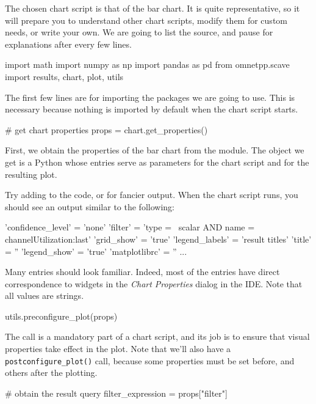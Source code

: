 The chosen chart script is that of the bar chart. It is quite representative, so
it will prepare you to understand other chart scripts, modify them for custom
needs, or write your own. We are going to list the source, and pause for
explanations after every few lines.

\begin{python}
import math
import numpy as np
import pandas as pd
from omnetpp.scave import results, chart, plot, utils
\end{python}

The first few lines are for importing the packages we are going to use. This is
necessary because nothing is imported by default when the chart script starts.

\begin{python}
# get chart properties
props = chart.get_properties()
\end{python}

First, we obtain the properties of the bar chart from the  module.
The  object we get is a Python  whose entries serve as
parameters for the chart script and for the resulting plot.

Try adding  to the code, or  for fancier output. When the chart script runs,
you should see an output similar to the following:

\begin{commandline}
'confidence_level' = 'none'
'filter' = 'type =~ scalar AND name =~ channelUtilization:last'
'grid_show' = 'true'
'legend_labels' = 'result titles'
'title' = ''
'legend_show' = 'true'
'matplotlibrc' = ''
...
\end{commandline}

Many entries should look familiar. Indeed, most of the entries have direct
correspondence to widgets in the \textit{Chart Properties} dialog in the IDE.
Note that all values are strings.

\begin{python}
utils.preconfigure_plot(props)
\end{python}

The  call is a mandatory part of a chart script, and
its job is to ensure that visual properties take effect in the plot. Note that
we'll also have a \texttt{postconfigure\_plot()} call, because some properties
must be set before, and others after the plotting.

\begin{python}
# obtain the result query
filter_expression = props["filter"]
\end{python}

